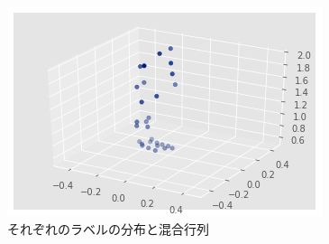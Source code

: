 \begin{figure}[htbp]
\begin{center}
\includegraphics[width=\textwidth]{images/coordinate_plot.png}
\end{center}
\caption{それぞれのラベルの分布と混合行列}
\label{figure:coordinate_plot}
\end{figure}
